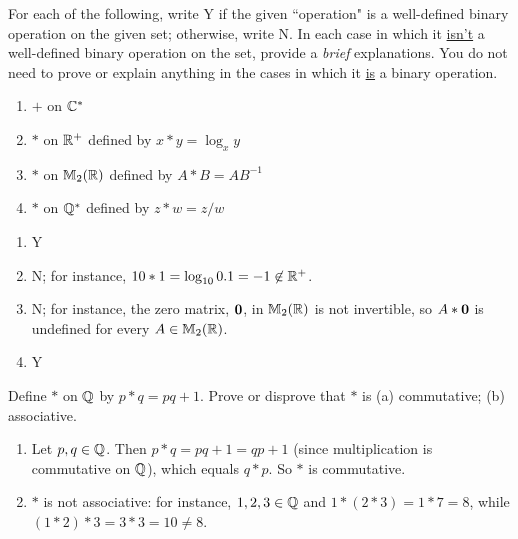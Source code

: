 \begin{exercise}[ID=2B]
For each of the following, write Y if the given ``operation" is a well-defined binary operation on the given set; otherwise, write N. In each case in which it \underline{isn't} a well-defined binary operation on the set, provide a \textit{brief} explanations. You do not need to prove or explain anything in the cases in which it \underline{is} a binary operation.

\begin{enumerate}
\item $+$ on $\mathbb{C}^*$
\item $*$ on $\mathbb{R}^+$ defined by $x*y=\log_x y$
\item $*$ on $\mathbb{M}_2(\mathbb{R})$ defined by $A*B=AB^{-1}$
\item $*$ on $\mathbb{Q}^*$ defined by $z*w=z/w$
\end{enumerate}

\end{exercise}

\begin{solution}[print=false]
\begin{enumerate}
\item Y
\item N; for instance, $10*1=\log_{10}0.1=-1\not\in\mathbb{R}^+$.
\item N; for instance, the zero matrix, $\mathbf 0$, in $\mathbb{M}_2(\mathbb{R})$ is not invertible, so $A*\mathbf 0$ is undefined for every $A\in\mathbb{M}_2(\mathbb{R})$.
\item Y

\end{enumerate}
\end{solution}


\begin{exercise}[ID=2D]
Define $*$ on $\mathbb{Q}$ by $p*q=pq+1$. Prove or disprove that $*$ is (a) commutative; (b) associative.
\end{exercise}

\begin{solution}[print=false]
\begin{enumerate}
\item Let $p,q\in \mathbb{Q}$.  Then $p*q=pq+1=qp+1$ (since multiplication is commutative on $\mathbb{Q}$), which equals $q*p$.  So $*$ is commutative.
\item  $*$ is not associative: for instance, $1,2,3\in \mathbb{Q}$ and $1*(2*3)=1*7=8$, while $(1*2)*3=3*3=10\neq 8$.
\end{enumerate}
\end{solution}

